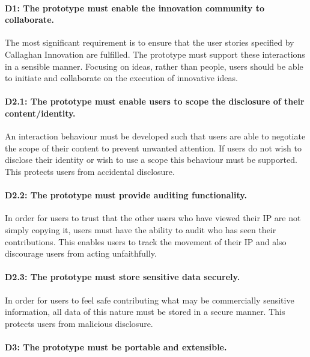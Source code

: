 \paragraph{D1: The prototype must enable the innovation community to collaborate.}

The most significant requirement is to ensure that the user stories specified by Callaghan Innovation are fulfilled. The prototype must support these interactions in a sensible manner. Focusing on ideas, rather than people, users should be able to initiate and collaborate on the execution of innovative ideas.

\paragraph{D2.1:  The prototype must enable users to scope the disclosure of their content/identity.}

An interaction behaviour must be developed such that users are able to negotiate the scope of their content to prevent unwanted attention. If users do not wish to disclose their identity or wish to use a scope this behaviour must be supported. This protects users from accidental disclosure.

\paragraph{D2.2: The prototype must provide auditing functionality.}

In order for users to trust that the other users who have viewed their IP are not simply copying it, users must have the ability to audit who has seen their contributions. This enables users to track the movement of their IP and also discourage users from acting unfaithfully.

\paragraph{D2.3: The prototype must store sensitive data securely.}

In order for users to feel safe contributing what may be commercially sensitive information, all data of this nature must be stored in a secure manner. This protects users from malicious disclosure.

\paragraph{D3:  The prototype must be portable and extensible.}

